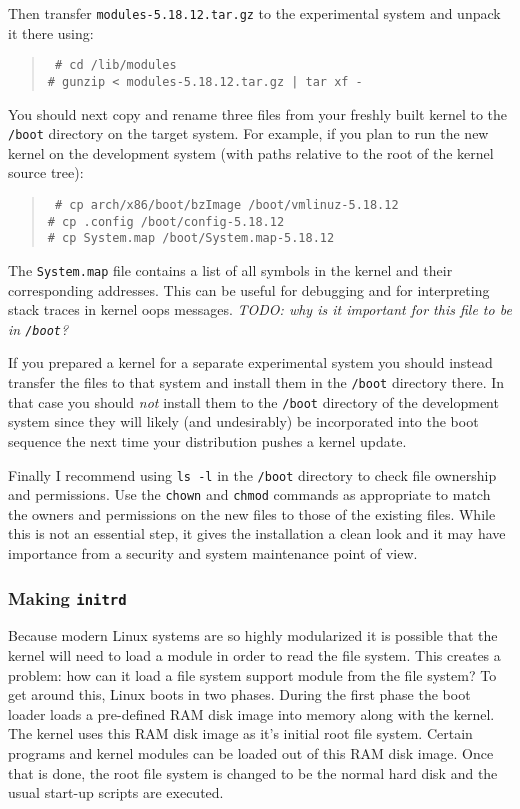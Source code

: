 \documentclass{article}
\newcommand{\command}[1]{\texttt{#1}}
\newcommand{\filename}[1]{\texttt{#1}}
\newcommand{\todo}[1]{\textit{TODO: #1}}
\newenvironment{commands}
  {\begin{quote} \tt}
  {\end{quote}}
\begin{document}
Then transfer \filename{modules-5.18.12.tar.gz} to the experimental system and unpack it there
using:
\begin{commands}
  \# cd /lib/modules \\
  \# gunzip < modules-5.18.12.tar.gz | tar xf -
\end{commands}

You should next copy and rename three files from your freshly built kernel to the
\filename{/boot} directory on the target system. For example, if you plan to run the new kernel
on the development system (with paths relative to the root of the kernel source tree):
\begin{commands}
  \# cp arch/x86/boot/bzImage /boot/vmlinuz-5.18.12 \\
  \# cp .config /boot/config-5.18.12 \\
  \# cp System.map /boot/System.map-5.18.12
\end{commands}

The \filename{System.map} file contains a list of all symbols in the kernel and their
corresponding addresses. This can be useful for debugging and for interpreting stack traces in
kernel oops messages. \todo{why is it important for this file to be in \filename{/boot}?}

If you prepared a kernel for a separate experimental system you should instead transfer the
files to that system and install them in the \filename{/boot} directory there. In that case you
should \emph{not} install them to the \filename{/boot} directory of the development system since
they will likely (and undesirably) be incorporated into the boot sequence the next time your
distribution pushes a kernel update.

Finally I recommend using \command{ls -l} in the \filename{/boot} directory to check file
ownership and permissions. Use the \command{chown} and \command{chmod} commands as appropriate
to match the owners and permissions on the new files to those of the existing files. While this
is not an essential step, it gives the installation a clean look and it may have importance from
a security and system maintenance point of view.


\subsubsection{Making \filename{initrd}}

Because modern Linux systems are so highly modularized it is possible that the kernel will need
to load a module in order to read the file system. This creates a problem: how can it load a
file system support module from the file system? To get around this, Linux boots in two phases.
During the first phase the boot loader loads a pre-defined RAM disk image into memory along with
the kernel. The kernel uses this RAM disk image as it's initial root file system. Certain
programs and kernel modules can be loaded out of this RAM disk image. Once that is done, the
root file system is changed to be the normal hard disk and the usual start-up scripts are
executed.
\end{document}

